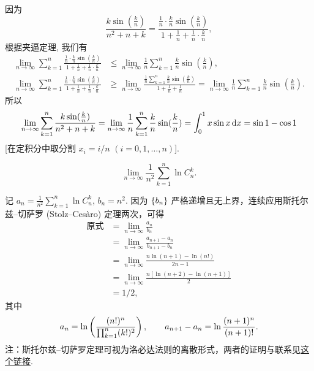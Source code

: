 \begin{solution}
    因为
    \[
    \frac{k \sin(\frac kn)}{n^2 + n + k} 
    = \frac{\frac 1n \cdot \frac kn \sin(\frac kn)}{1 + \frac 1n + \frac 1n \cdot \frac kn},
    \]
    根据夹逼定理, 我们有
    \begin{align*}
    \lim_{n \to \infty} \sum_{k = 1}^n \frac{\frac 1n \cdot \frac kn \sin(\frac kn)}{1 + \frac 1n + \frac 1n \cdot \frac kn}
    &\le \lim_{n \to \infty} \frac 1n \sum_{k = 1}^n \frac kn \sin(\frac kn), \\
    \lim_{n \to \infty} \sum_{k = 1}^n \frac{\frac 1n \cdot \frac kn \sin(\frac kn)}{1 + \frac 1n + \frac 1n \cdot \frac kn}
    &\ge \lim_{n \to \infty}  \frac{\frac 1n \sum_{k = 1}^n \frac kn \sin(\frac kn)}{1 + \frac 1n + \frac 1n} 
    = \lim_{n \to \infty} \frac 1n \sum_{k = 1}^n \frac kn \sin(\frac kn).
    \end{align*}
    所以
    \[
    \lim_{n \to \infty} \sum_{k = 1}^n \frac{k \sin(\frac kn)}{n^2 + n + k}
    =\lim_{n \to \infty} \frac 1n \sum_{k = 1}^n \frac kn \sin(\frac kn)
    = \int_0^1 x \sin x \mathop{}\!\mathrm{d} x
    = \sin 1 - \cos 1
    \]
    [在定积分中取分割 $x_i = i / n$ $(i = 0, 1, \ldots, n)$].
\end{solution}

\begin{exercise}
    \[
        \lim_{n \to \infty} \frac{1}{n^2}\sum_{k = 1}^{n} \ln C_n^k.
    \]
\end{exercise}

\begin{solution}
    记 $a_n = \frac{1}{n^2}\sum_{k = 1}^{n} \ln C_n^k$, $b_n = n^2$. 因为 $\set{b_n}$ 严格递增且无上界，连续应用斯托尔兹–切萨罗 (Stolz–Cesàro) 定理两次，可得
    \begin{align*}
        \text{原式} 
        &= \lim_{n \to \infty} \frac{a_n}{b_n} \\
        &= \lim_{n \to \infty} \frac{a_{n + 1} - a_n}{b_{n + 1} - b_n} \\
        &= \lim_{n \to \infty} \frac{n \ln(n + 1) - \ln(n!)}{2n - 1} \\
        &= \lim_{n \to \infty} \frac{n[\ln(n + 2) - \ln(n + 1)]}{2} \\
        &= 1 / 2,
    \end{align*}
    其中
    \[
        a_n = \ln \del[3]{\frac{(n!)^n}{\prod_{k = 1}^{n} (k!)^2}},
        \qquad
        a_{n + 1} - a_n = \ln \frac{(n + 1)^n}{(n + 1)!}.
    \]
    注：斯托尔兹–切萨罗定理可视为洛必达法则的离散形式，两者的证明与联系见\href{http://www.imomath.com/index.php?options=686}{这个链接}.
\end{solution}

